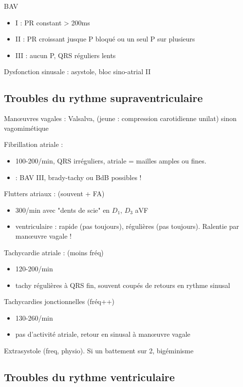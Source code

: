 BAV
\begin{itemize}
  \item I : PR constant > 200ms
  \item II : PR croissant jusque P bloqué ou un seul P sur plusieurs
  \item III : aucun P, QRS réguliers lents
\end{itemize}

Dysfonction sinusale : asystole, bloc sino-atrial II

\subsection{Troubles du rythme supraventriculaire}
Man\oe{}uvres vagales : Valsalva, (jeune : compression carotidienne unilat) sinon
vagomimétique

Fibrillation atriale : 
\begin{itemize}
  \item 100-200/min, QRS irréguliers, atriale = mailles amples ou fines.
  \item \danger{} : BAV III, brady-tachy ou BdB possibles !
\end{itemize}
Flutters atriaux : (souvent + FA)
\begin{itemize}
  \item 300/min avec "dents de scie" en $D_1$, $D_3$ aVF
  \item ventriculaire : rapide (pas toujours), régulières (pas toujours).
    Ralentie par man\oe{}uvre vagale !
\end{itemize}
Tachycardie atriale : (moins fréq)
\begin{itemize}
  \item 120-200/min
  \item tachy régulières à QRS fin, souvent coupés de retours en rythme sinusal
\end{itemize}
Tachycardies jonctionnelles (fréq++)
\begin{itemize}
  \item 130-260/min
  \item pas d'activité atriale, retour en sinusal à man\oe{}uvre vagale
\end{itemize}
Extrasystole (freq, physio). Si un battement sur 2, bigéminisme

\subsection{Troubles du rythme ventriculaire}

